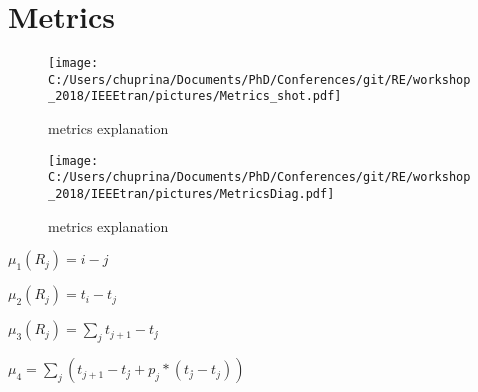\section{Metrics}
\label{sec:Solution} 

\begin{figure}[htpb!]
	\centering
		\texttt{[image: C:/Users/chuprina/Documents/PhD/Conferences/git/RE/workshop\_2018/IEEEtran/pictures/Metrics\_shot.pdf]}
	\caption{metrics explanation}
	\label{fig:Metrics_shot}
\end{figure}

\begin{figure}[!t]
	\centering
		\texttt{[image: C:/Users/chuprina/Documents/PhD/Conferences/git/RE/workshop\_2018/IEEEtran/pictures/MetricsDiag.pdf]}
	\caption{metrics explanation}
	\label{fig:Metrics_shot}
\end{figure}


$\mu_{1}(R_{j}) = i-j$

$\mu_{2}(R_{j}) = t_{i}-t_{j}$

$\mu_{3}(R_{j}) = \displaystyle\sum_{j} t_{j+1}-t_{j}\acute{}$

$\mu_{4} = \displaystyle\sum_{j} (t_{j+1}-t_{j}\acute{} + p_{j}*(t_{j}\acute{} - t_{j}))$


